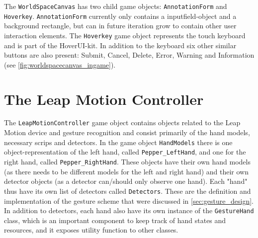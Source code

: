 The \texttt{WorldSpaceCanvas} has two child game objects: \texttt{AnnotationForm} and \texttt{Hoverkey}. 
\texttt{AnnotationForm} currently only contains a inputfield-object and a background rectangle, but can in future iteration grow to 
contain other user interaction elements. The \texttt{Hoverkey} game object represents the touch keyboard and is part of the HoverUI-kit.
In addition to the keyboard six other similar buttons are also present: Submit, Cancel, Delete, Error, Warning and Information (see \ref{fig:worldspacecanvas_ingame}).

\section{The Leap Motion Controller}
The \texttt{LeapMotionController} game object contains objects related to the Leap Motion device and gesture recognition and consist primarily of the hand models, necessary 
scrips and detectors. In the game object \texttt{HandModels} there is one object-representation of the left hand, called \texttt{Pepper\_LeftHand}, and one for the 
right hand, called \texttt{Pepper\_RightHand}. These objects have their own hand models (as there needs to be different models for the left and right hand) and their 
own detector objects (as a detector can/should only observe one hand). Each "hand" thus have its own list of detectors called \texttt{Detectors}. 
These are the definition and implementation of the gesture scheme that were discussed in \ref{sec:gesture_design}. In addition to detectors, each
hand also have its own instance of the \texttt{GestureHand} class, which is an important component to keep track of hand states and resources, and
it exposes utility function to other classes. 


